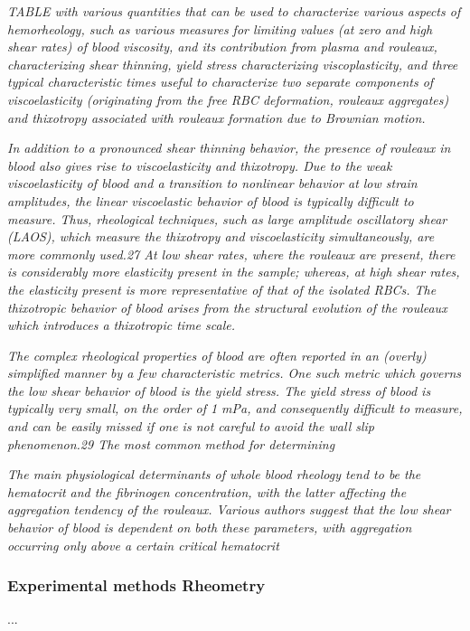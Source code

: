 \documentclass[11pt,letterpaper]{article}
\begin{document}
\textit{TABLE with various quantities that can be used to characterize various aspects of hemorheology, such as various measures for limiting values (at zero and high shear rates) of blood viscosity, and its contribution from plasma and rouleaux, characterizing shear thinning, yield stress characterizing viscoplasticity, and three typical characteristic times useful to characterize two separate components of viscoelasticity (originating from the free RBC deformation, rouleaux aggregates) and thixotropy associated with rouleaux formation due to Brownian motion.}

\textit{In addition to a pronounced shear thinning behavior, the
presence of rouleaux in blood also gives rise to viscoelasticity and thixotropy. Due to the weak viscoelasticity of blood and a transition to nonlinear behavior at low strain amplitudes, the linear viscoelastic behavior of blood is typically difficult to measure. Thus, rheological techniques, such as large amplitude oscillatory shear (LAOS), which measure the thixotropy and viscoelasticity simultaneously, are more commonly used.27 At low shear rates, where the rouleaux are present, there is considerably more elasticity present in the sample; whereas, at high shear rates, the elasticity present is more representative of that of the isolated RBCs. The thixotropic behavior of blood arises from the structural evolution of the rouleaux which introduces a thixotropic time scale.}

 \textit{The complex rheological properties of blood are often
reported in an (overly) simplified manner by a few characteristic metrics. One such metric which governs the low shear behavior of blood is the yield stress. The yield stress of blood is typically very small, on the order of 1 mPa, and consequently difficult to measure, and can be easily missed if one is not careful to avoid the wall slip phenomenon.29 The most common method for determining}


\textit{The main physiological determinants of whole blood rheology
tend to be the hematocrit and the fibrinogen concentration, with the latter affecting the aggregation tendency of the rouleaux. Various authors suggest that the low shear behavior of blood is dependent on both these parameters, with aggregation occurring only above a certain critical hematocrit}


\subsubsection*{Experimental methods
Rheometry}...
\end{document}
